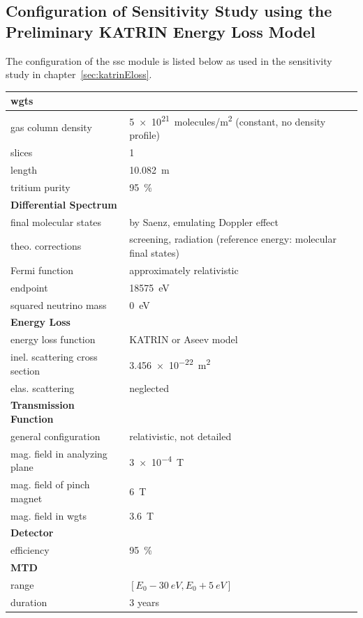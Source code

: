 \begin{samepage}
\section{Configuration of Sensitivity Study using the Preliminary KATRIN Energy Loss Model}
\label{sec:appendixKatrinElossSSCConfig}
The configuration of the \gls{ssc} module is listed below as used in the sensitivity study in chapter~\ref{sec:katrinEloss}.

\newcommand{\myModelConfigTableStrut}{\rule{0pt}{4ex}}
\begin{tabular}{ll}
	\toprule
	\textbf{\gls{wgts}} & \\
	\midrule
	gas column density & \SI{5e21}{molecules/m^2} (constant, no density profile) \\
	slices & 1 \\
	length & \SI{10.082}{m} \\
	tritium purity & \SI{95}{\percent} \\
	\myModelConfigTableStrut
	\textbf{Differential Spectrum} & \\
	\midrule
	final molecular states & by Saenz, emulating Doppler effect \\
	theo. corrections & screening, radiation (reference energy: molecular final states) \\
	Fermi function & approximately relativistic \\
	endpoint & \SI{18575}{eV} \\
	squared neutrino mass & \SI{0}{eV} \\
	\myModelConfigTableStrut
	\textbf{Energy Loss} & \\
	\midrule
	energy loss function & KATRIN or Aseev model \\
	inel. scattering cross section & \SI{3.456e-22}{m^2} \\
	elas. scattering & neglected \\
	\myModelConfigTableStrut
	\textbf{Transmission Function} & \\
	\midrule
	general configuration & relativistic, not detailed \\
	mag. field in analyzing plane & \SI{3e-4}{T} \\
	mag. field of pinch magnet & \SI{6}{T} \\
	mag. field in \gls{wgts} & \SI{3.6}{T} \\
	\myModelConfigTableStrut
	\textbf{Detector} & \\
	\midrule
	efficiency & \SI{95}{\percent} \\
	\textbf{MTD} & \\
	\midrule
	range & $[E_0-\SI{30}{eV},E_0+\SI{5}{eV}]$ \\
	duration & 3 years \\
	\bottomrule
\end{tabular}
\end{samepage}